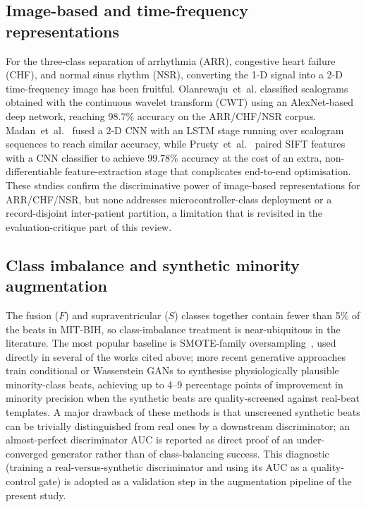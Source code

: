 \subsection{Image-based and time-frequency representations}

For the three-class separation of arrhythmia (ARR), congestive heart
failure (CHF), and normal sinus rhythm (NSR), converting the 1-D signal into
a 2-D time-frequency image has been fruitful. Olanrewaju~et~al.
\cite{olanrewaju2021cwt} classified scalograms obtained with the continuous
wavelet transform (CWT) using an AlexNet-based deep network, reaching 98.7\%
accuracy on the ARR/CHF/NSR corpus. Madan~et~al.~\cite{madan2022} fused a 2-D CNN
with an LSTM stage running over scalogram sequences to reach similar
accuracy, while Prusty~et~al.~\cite{prusty2024} paired SIFT features with a
CNN classifier to achieve 99.78\% accuracy at the cost of an extra,
non-differentiable feature-extraction stage that complicates end-to-end
optimisation. These studies confirm the discriminative power of image-based
representations for ARR/CHF/NSR, but none addresses microcontroller-class
deployment or a record-disjoint inter-patient partition, a limitation that
is revisited in the evaluation-critique part of this review.

\subsection{Class imbalance and synthetic minority augmentation}

The fusion ($F$) and supraventricular ($S$) classes together contain fewer
than 5\% of the beats in MIT-BIH, so class-imbalance treatment is
near-ubiquitous in the literature. The most popular baseline is SMOTE-family
oversampling~\cite{chawla2002smote}, used directly in several of the works
cited above; more recent generative approaches train conditional or
Wasserstein GANs to synthesise physiologically plausible minority-class
beats, achieving up to 4--9 percentage points of improvement in minority
precision when the synthetic beats are quality-screened against real-beat
templates. A major drawback of these methods is that unscreened synthetic
beats can be trivially distinguished from real ones by a downstream
discriminator; an almost-perfect discriminator AUC is reported as direct
proof of an under-converged generator rather than of class-balancing
success. This diagnostic (training a real-versus-synthetic discriminator
and using its AUC as a quality-control gate) is adopted as a validation
step in the augmentation pipeline of the present study.

